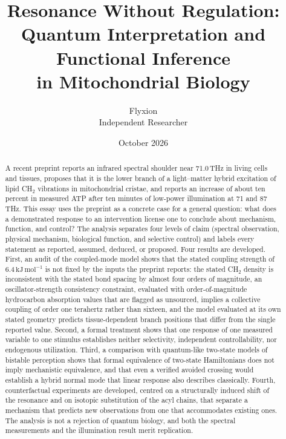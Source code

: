 \documentclass[11pt]{article}
\title{Resonance Without Regulation:\\[0.3em]
Quantum Interpretation and Functional Inference\\[0.2em]
in Mitochondrial Biology}
\author{Flyxion\\ \small Independent Researcher}
\date{October 2026}
\newcommand{\kjm}{\,\mathrm{kJ\,mol^{-1}}}
\theoremstyle{plain}
\theoremstyle{definition}
\theoremstyle{remark}
\begin{document}
\maketitle

\begin{abstract}
\noindent A recent preprint reports an infrared spectral shoulder near 71.0\,THz in living cells and tissues, proposes that it is the lower branch of a light--matter hybrid excitation of lipid CH$_2$ vibrations in mitochondrial cristae, and reports an increase of about ten percent in measured ATP after ten minutes of low-power illumination at 71 and 87\,THz. This essay uses the preprint as a concrete case for a general question: what does a demonstrated response to an intervention license one to conclude about mechanism, function, and control? The analysis separates four levels of claim (spectral observation, physical mechanism, biological function, and selective control) and labels every statement as reported, assumed, deduced, or proposed. Four results are developed. First, an audit of the coupled-mode model shows that the stated coupling strength of $6.4\kjm$ is not fixed by the inputs the preprint reports: the stated CH$_2$ density is inconsistent with the stated bond spacing by almost four orders of magnitude, an oscillator-strength consistency constraint, evaluated with order-of-magnitude hydrocarbon absorption values that are flagged as unsourced, implies a collective coupling of order one terahertz rather than sixteen, and the model evaluated at its own stated geometry predicts tissue-dependent branch positions that differ from the single reported value. Second, a formal treatment shows that one response of one measured variable to one stimulus establishes neither selectivity, independent controllability, nor endogenous utilization. Third, a comparison with quantum-like two-state models of bistable perception shows that formal equivalence of two-state Hamiltonians does not imply mechanistic equivalence, and that even a verified avoided crossing would establish a hybrid normal mode that linear response also describes classically. Fourth, counterfactual experiments are developed, centred on a structurally induced shift of the resonance and on isotopic substitution of the acyl chains, that separate a mechanism that predicts new observations from one that accommodates existing ones. The analysis is not a rejection of quantum biology, and both the spectral measurements and the illumination result merit replication.
\end{abstract}
\end{document}
